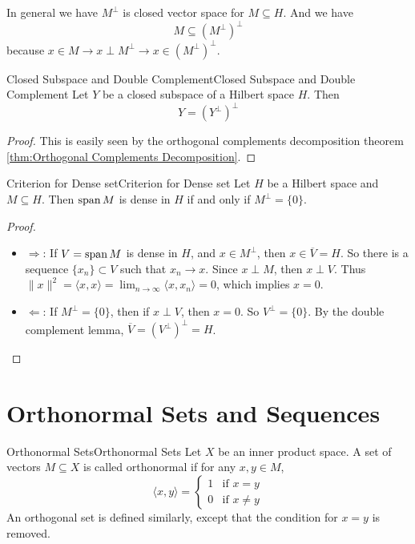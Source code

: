 \documentclass[../main.tex]{subfiles}
\begin{document}
In general we have $M^\perp$ is closed vector space for $M \subseteq H$. And we have
\begin{equation*}
	M \subseteq (M^\perp)^\perp
\end{equation*}
because $x\in M \rightarrow x\perp M^\perp \rightarrow x\in (M^\perp)^\perp$.

\begin{lemma}{Closed Subspace and Double Complement}{Closed Subspace and Double Complement}
	Let $Y$ be a closed subspace of a Hilbert space $H$. Then
	\begin{equation}
		Y = (Y^\perp)^\perp
	\end{equation}
\end{lemma}
\begin{proof}
	This is easily seen by the orthogonal complements decomposition theorem \ref{thm:Orthogonal Complements Decomposition}.
\end{proof}

\begin{lemma}{Criterion for Dense set}{Criterion for Dense set}
	Let $H$ be a Hilbert space and $M\subseteq H$. Then $\operatorname{span} M$ is dense in $H$ if and only if $M^\perp = \{0\}$.
\end{lemma}
\begin{proof}
\begin{itemize}
	\item $\Rightarrow$: If $V = \operatorname{span} M$ is dense in $H$, and $x\in M^\perp$, then $x\in \overline{V}=H$. So there is a sequence $\{x_n\} \subset V$ such that $x_n \to x$. Since $x\perp M$, then $x\perp V$. Thus $\|x\|^2 = \langle x, x \rangle = \lim_{n\to\infty} \langle x, x_n \rangle = 0$, which implies $x=0$.
	\item $\Leftarrow$: If $M^\perp = \{0\}$, then if $x\perp V$, then $x=0$. So $V^\perp = \{0\}$. By the double complement lemma, $\overline{V} = (V^\perp)^\perp = H$.
\end{itemize}
\end{proof}

\section{Orthonormal Sets and Sequences}

\begin{definition}{Orthonormal Sets}{Orthonormal Sets}
	Let $X$ be an inner product space. A set of vectors $M \subseteq X$ is called orthonormal if for any $x,y \in M$,
	\begin{equation}
		\langle x, y \rangle = \begin{cases}
			1 & \text{if } x = y\\
			0 & \text{if } x \neq y
		\end{cases}
	\end{equation}
	An orthogonal set is defined similarly, except that the condition for $x=y$ is removed.
\end{definition}
\end{document}

